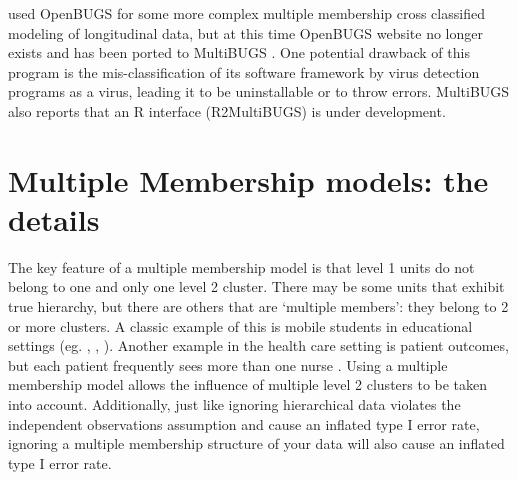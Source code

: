 \documentclass[
]{book}
\begin{document}
\citet{Heck2022} used OpenBUGS for some more complex multiple membership cross classified modeling of longitudinal data, but at this time OpenBUGS website no longer exists and has been ported to MultiBUGS \citep[\citet{BUGS2020}]{MultiBUGS}. One potential drawback of this program is the mis-classification of its software framework by virus detection programs as a virus, leading it to be uninstallable or to throw errors. MultiBUGS also reports that an R interface (R2MultiBUGS) is under development.

\hypertarget{multiple-membership-models-the-details}{%
\chapter{Multiple Membership models: the details}\label{multiple-membership-models-the-details}}

The key feature of a multiple membership model is that level 1 units do not belong to one and only one level 2 cluster. There may be some units that exhibit true hierarchy, but there are others that are `multiple members': they belong to 2 or more clusters. A classic example of this is mobile students in educational settings (eg. \citet{Chung2012}, \citet{Heck2022}, \citet{Leroux}). Another example in the health care setting is patient outcomes, but each patient frequently sees more than one nurse \citep{Leckie2013}. Using a multiple membership model allows the influence of multiple level 2 clusters to be taken into account. Additionally, just like ignoring hierarchical data violates the independent observations assumption and cause an inflated type I error rate, ignoring a multiple membership structure of your data will also cause an inflated type I error rate.
\end{document}
